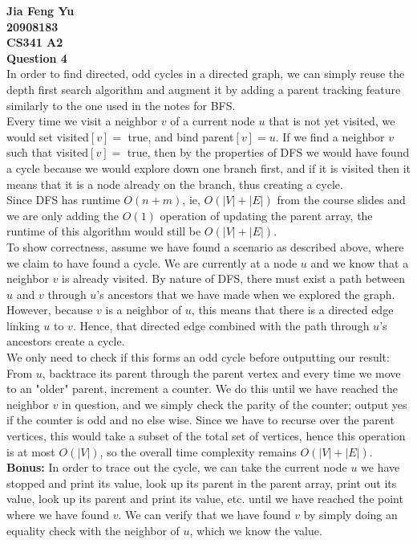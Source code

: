 \documentclass[12pt]{article}
\begin{document}
	\textbf{
		{\Large Jia Feng Yu \\ 20908183\\ CS341 A2 \\ Question 4}
}\\
		In order to find directed, odd cycles in a directed graph, we can simply reuse the depth first search algorithm and augment it by adding a parent tracking feature similarly to the one used in the notes for BFS.\\
		Every time we visit a neighbor $v$ of a current node $u$ that is not yet visited, we would set visited$[v]= $ true, and bind parent$[v] = u$.
		If we find a neighbor $v$ such that visited$[v]= $ true, then by the properties of DFS we would have found a cycle because we would explore down one branch first, and if it is visited then it means that it is a node already on the branch, thus creating a cycle.\\
		Since DFS has runtime $O(n+m)$, ie, $O(|V|+|E|)$ from the course slides and we are only adding the $O(1)$ operation of updating the parent array, the runtime of this algorithm would still be $O(|V|+|E|)$.\\
		To show correctness, assume we have found a scenario as described above, where we claim to have found a cycle. We are currently at a node $u$ and we know that a neighbor $v$ is already visited. By nature of DFS, there must exist a path between $u$ and $v$ through $u$'s ancestors that we have made when we explored the graph. However, because $v$ is a neighbor of $u$, this means that there is a directed edge linking $u$ to $v$. Hence, that directed edge combined with the path through $u$'s ancestors create a cycle.\\
		We only need to check if this forms an odd cycle before outputting our result:\\
		From $u$, backtrace its parent through the parent vertex and every time we move to an "older" parent, increment a counter. We do this until we have reached the neighbor $v$ in question, and we simply check the parity of the counter; output yes if the counter is odd and no else wise. Since we have to recurse over the parent vertices, this would take a subset of the total set of vertices, hence this operation is at most $O(|V|)$, so the overall time complexity remains $O(|V|+|E|)$.\\
		\textbf{Bonus: }In order to trace out the cycle, we can take the current node $u$ we have stopped and print its value, look up its parent in the parent array, print out its value, look up its parent and print its value, etc. until we have reached the point where we have found $v$. We can verify that we have found $v$ by simply doing an equality check with the neighbor of $u$, which we know the value. 
\end{document}
